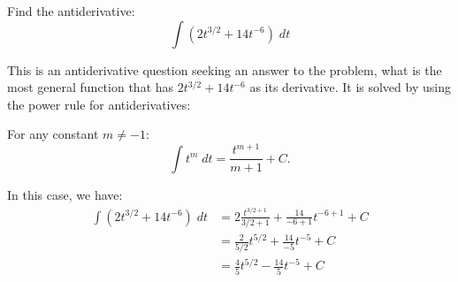 \documentclass{ximera}
\author{Emma Smith Zbarsky}
\begin{document}
\begin{exercise}

Find the antiderivative: \[\int (2t^{3/2}+14t^{-6})\; dt\]


\begin{hint}
This is an antiderivative question seeking an answer to the problem,
what is the most general function that has $2t^{3/2}+14t^{-6}$ as its
derivative. It is solved by using the power rule for antiderivatives:

For any constant $m \neq -1$:
\[\int t^{m} \; dt = \frac{t^{m+1}}{m+1}+C.\]
\end{hint}


\begin{hint}
In this case, we have: \begin{align*}
\int (2t^{3/2} + 14t^{-6})\; dt &= 2\frac{t^{3/2+1}}{3/2+1}+\frac{14}{-6+1}t^{-6+1} +C \\
&= \frac{2}{5/2}t^{5/2}+\frac{14}{-5}t^{-5}+C \\
&= \frac{4}{5}t^{5/2}-\frac{14}{5}t^{-5}+C
\end{align*}
\end{hint}


\begin{multipleChoice}
\end{multipleChoice}

\end{exercise}
\end{document}
